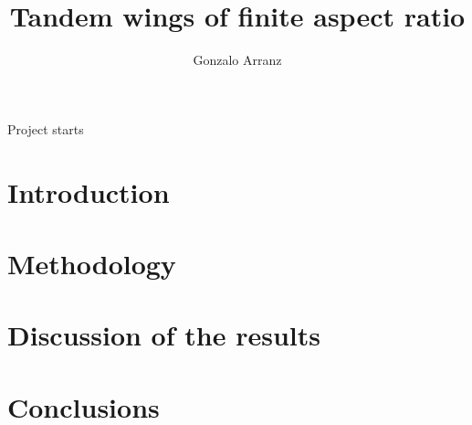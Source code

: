 \documentclass[a4paper]{article}
\author{Gonzalo Arranz}
\title{Tandem wings of finite aspect ratio}
\begin{document}
\maketitle

Project starts
\section{Introduction\label{s:intro}}


\section{Methodology\label{s:met}}


\section{Discussion of the results\label{s:results}}

\section{Conclusions\label{s:conc}}
\end{document}
